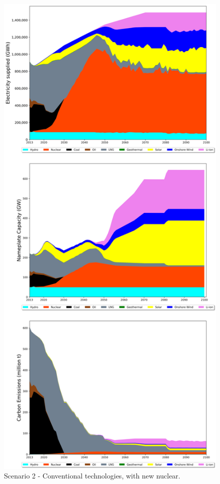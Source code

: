 \begin{figure}[h] 
\centering
\vspace*{-3cm}
\includegraphics[scale=0.42]{figures/conv_nuc}
\caption{Scenario 2 - Conventional technologies, with new nuclear.}
\label{scen2}
\end{figure}

